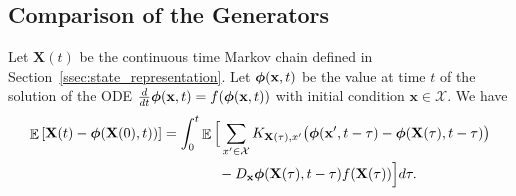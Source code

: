 \documentclass[acmsmall]{acmart}
\newcommand\bx{\mathbf{x}}
\newcommand\bX{\mathbf{X}}
\newcommand\bphi{\text{\boldmath$\phi$}}
\newcommand\calX{\mathcal{X}}
\newcommand{\R}{\ensuremath{\mathbb{R}}}
\DeclareMathOperator{\E}{\mathbb{E}} %
\newcommand\esp[1]{\E\left[#1\right]} %
\newcommand\conv[1]{\mathrm{conv}(#1)}      %
\begin{document}

\subsection{Comparison of the Generators}
\label{sec:proof_lemma}

\begin{lemma}
  \label{lemma:generator_comparison}
  Let $\bX(t)$ be the continuous time Markov chain defined in Section~\ref{ssec:state_representation}. Let $\bphi(\bx, t)$ be the value at time $t$ of the solution of the ODE $\frac{d}{dt}\bphi(\bx, t) = f(\bphi(\bx, t))$ with initial condition $\bx\in\calX$. We have
  \begin{align*}
  \esp {\bX(t) - \bphi(\bX(0),t))} & = \int_0^t \E\Big[ \sum_{x'\in \calX} K_{\bX(\tau),x'} \bigl( \bphi(\bx',t-\tau) -  \bphi(\bX(\tau),t-\tau) \bigr) \\
  & \qquad\qquad - D_\bx \bphi(\bX(\tau),t-\tau)f(\bX(\tau)) \Big] d\tau.
  \end{align*}
  \end{lemma}
  
\end{document}
